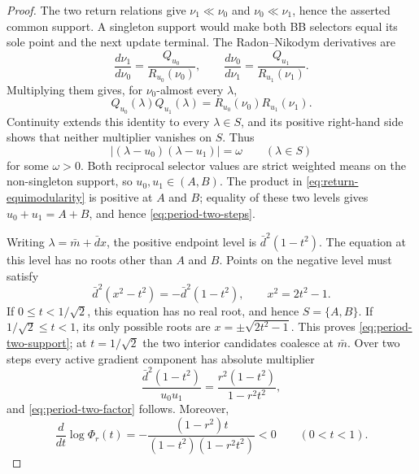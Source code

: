\documentclass[letterpaper,twoside]{article}
\begin{document}
\begin{proof}
The two return relations give $\nu_1\ll\nu_0$ and
$\nu_0\ll\nu_1$, hence the asserted common support.  A singleton support would
make both BB selectors equal its sole point and the next update terminal.  The
Radon--Nikodym derivatives are
\[
 \frac{d\nu_1}{d\nu_0}
 =\frac{Q_{u_0}}{R_{u_0}(\nu_0)},
 \qquad
 \frac{d\nu_0}{d\nu_1}
 =\frac{Q_{u_1}}{R_{u_1}(\nu_1)}.
\]
Multiplying them gives, for $\nu_0$-almost every $\lambda$,
\[
 Q_{u_0}(\lambda)Q_{u_1}(\lambda)
 =R_{u_0}(\nu_0)R_{u_1}(\nu_1).
\]
Continuity extends this identity to every $\lambda\in S$, and its positive
right-hand side shows that neither multiplier vanishes on $S$.
Thus
\begin{equation}\label{eq:return-equimodularity}
 |(\lambda-u_0)(\lambda-u_1)|=\omega
 \qquad(\lambda\in S)
\end{equation}
for some $\omega>0$.  Both reciprocal selector values are strict weighted
means on the non-singleton support, so $u_0,u_1\in(A,B)$.  The product in
\eqref{eq:return-equimodularity} is positive at $A$ and $B$; equality of
these two levels gives $u_0+u_1=A+B$, and hence
\eqref{eq:period-two-steps}.

Writing $\lambda=\bar m+\bar d x$, the positive endpoint level is
$\bar d^2(1-t^2)$.  The equation at this level has no roots other than
$A$ and $B$.  Points on the negative level must satisfy
\[
 \bar d^2(x^2-t^2)=-\bar d^2(1-t^2),
 \qquad x^2=2t^2-1.
\]
If $0\le t<1/\sqrt2$, this equation has no real root, and hence
$S=\{A,B\}$.  If $1/\sqrt2\le t<1$, its only possible roots are
$x=\pm\sqrt{2t^2-1}$.  This proves \eqref{eq:period-two-support}; at
$t=1/\sqrt2$ the two interior candidates coalesce at $\bar m$.  Over two
steps every active gradient component has absolute multiplier
\[
 \frac{\bar d^2(1-t^2)}{u_0u_1}
 =\frac{r^2(1-t^2)}{1-r^2t^2},
\]
and \eqref{eq:period-two-factor} follows.  Moreover,
\[
 \frac{d}{dt}\log\Phi_r(t)
 =-\frac{(1-r^2)t}{(1-t^2)(1-r^2t^2)}<0
 \qquad(0<t<1).
\]


\end{proof}
\end{document}
